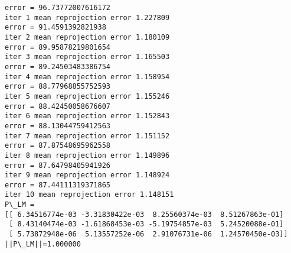 \documentclass[11pt]{article}
\begin{document}
    \begin{Verbatim}[commandchars=\\\{\}]
error = 96.73772007616172
iter 1 mean reprojection error 1.227809
error = 91.4591392821938
iter 2 mean reprojection error 1.180109
error = 89.95878219801654
iter 3 mean reprojection error 1.165503
error = 89.24503483386754
iter 4 mean reprojection error 1.158954
error = 88.77968855752593
iter 5 mean reprojection error 1.155246
error = 88.42450058676607
iter 6 mean reprojection error 1.152843
error = 88.13044759412563
iter 7 mean reprojection error 1.151152
error = 87.87548695962558
iter 8 mean reprojection error 1.149896
error = 87.64798405941926
iter 9 mean reprojection error 1.148924
error = 87.44111319371865
iter 10 mean reprojection error 1.148151
P\_LM =
[[ 6.34516774e-03 -3.31830422e-03  8.25560374e-03  8.51267863e-01]
 [ 8.43140474e-03 -1.61868453e-03 -5.19754857e-03  5.24520088e-01]
 [ 5.73872948e-06  5.13557252e-06  2.91076731e-06  1.24570450e-03]]
||P\_LM||=1.000000

    \end{Verbatim}

    \begin{center}
    \end{center}
    { \hspace*{\fill} \\}
    

    
    
    
    
\end{document}
